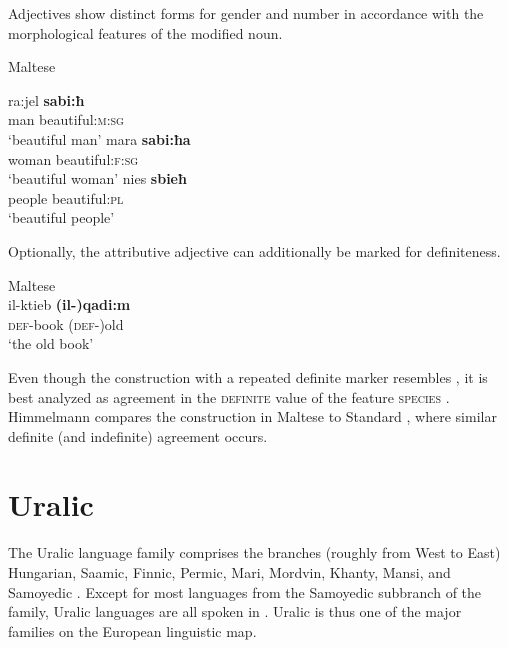 Adjectives show distinct forms for gender and number in accordance with the morphological features of the modified noun.
\begin{exe}
\ex \rm{Maltese \citep[328]{aquilina1959}}
\begin{xlist}
\ex
\gll	ra:jel \textbf{sabi:ħ}\\
	man beautiful:\textsc{m:sg}\\
\glt	‘beautiful man’
\ex
\gll	mara \textbf{sabi:ħa}\\
	woman beautiful:\textsc{f:sg}\\
\glt	‘beautiful woman’
\ex
\gll	nies \textbf{sbieħ}\\
	people beautiful:\textsc{pl}\\
\glt	‘beautiful people’
\end{xlist}
\end{exe}
Optionally, the attributive adjective can additionally be marked for definiteness.
\begin{exe}
\ex \rm{Maltese \citep[330]{aquilina1959}}\\
\gll	il-ktieb \textbf{(il-)qadi:m}\\
	\textsc{def}-book	(\textsc{def-})old\\
\glt	‘the old book’
\end{exe}
Even though the construction with a repeated definite marker resembles , it is best analyzed as agreement in the \textsc{definite} value of the feature \textsc{species} \citep[179]{himmelmann1997}. Himmelmann compares the construction in Maltese to Standard , where similar definite (and indefinite) agreement occurs.
				
\section{Uralic}
\label{uralic synchr}
The Uralic language family comprises the branches (roughly from West to East) Hungarian, Saamic, Finnic, Permic, Mari, Mordvin, Khanty, Mansi, and Samoyedic \citep[216–218]{salminen2007}. Except for most languages from the Samoyedic subbranch of the family, Uralic languages are all spoken in . Uralic is thus one of the major families on the European linguistic map.

